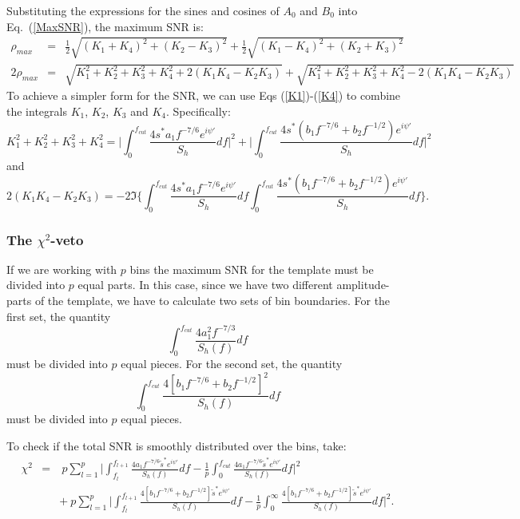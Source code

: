 Substituting the expressions for the sines and cosines of $A_0$ and
$B_0$
into Eq.~(\ref{MaxSNR}), the maximum SNR is:
\begin{eqnarray}
 \rho_{max} &=& \frac{1}{2} \sqrt{(K_1+K_4)^2 + (K_2-K_3)^2} +
\frac{1}{2} \sqrt{(K_1-K_4)^2 +(K_2+K_3)^2}\\
2\rho_{max}&=& \sqrt{ K_1^2 + K_2^2 + K_3^2 +K_4^2 + 2(K_1 K_4
	- K_2 K_3)} + \sqrt{  K_1^2 + K_2^2 + K_3^2 +K_4^2 -2(K_1
	K_4 -  K_2 K_3)} 
\end{eqnarray}
To achieve a simpler form for the SNR, we can use Eqs (\ref{K1})-(\ref{K4}) to 
combine the integrals $K_1$, $K_2$, $K_3$ and $K_4$.
Specifically:
\begin{equation}
K_1^2 + K_2^2 + K_3^2 + K_4^2 = \Big | \int_0^{f_{cut}} \frac{4 s^{\ast} a_1
	f^{-7/6} e^{i \psi'}}{S_h} df \Big |^2 + \Big | \int_0^{f_{cut}}
	\frac{4 s^{\ast} (b_1 f^{-7/6} + b_2 f^{-1/2}) e^{i \psi'}}{S_h} df
	\Big |^2
\end{equation}
and
\begin{equation}
2(K_1 K_4- K_2 K_3) = - 2 \Im \Big \{ \int_0^{f_{cut}} \frac{4 s^{\ast} a_1
	f^{-7/6} e^{i \psi'}}{S_h} df \int_0^{f_{cut}} \frac{4 s^{\ast}
	(b_1 f^{-7/6} + b_2 f^{-1/2}) e^{i \psi'}}{S_h} df \Big \}.
\end{equation}

\subsubsection*{The $\chi^2$-veto}
\label{ChisquaredVeto}

If we are working with $p$ bins the maximum SNR for the template must be 
divided into $p$ equal parts. In this case, since we have two different 
amplitude-parts of the template, we have to calculate two sets of bin
boundaries.
For the first set, the quantity
\begin{displaymath}
\int_0^{f_{cut}} \frac{4 a_1^2 f^{-7/3}}{S_h(f)} df
\end{displaymath}
must be divided into $p$ equal pieces.
For the second set, the quantity
\begin{displaymath}
\int_0^{f_{cut}} \frac{4 [b_1 f^{-7/6} + b_2 f^{-1/2}]^2}{S_h(f)} df
\end{displaymath} 
must be divided into $p$ equal pieces.

To check if the total SNR is smoothly distributed over the bins,
take:
\begin{eqnarray}
\chi^2 &=& \: p \sum_{l=1}^p  \Big | \int_{f_l}^{f_{l+1}} \frac{4 a_1 
     f^{-7/6} \tilde{s}^{\ast} e^{i \psi'}}{S_h(f)} df
     - \frac{1}{p} \int_{0}^{f_{cut}} \frac{4 a_1 f^{-7/6}
 \tilde{s}^{\ast} e^{i \psi'}}{S_h(f)} df \Big |^2 \\
      && +\: p\sum_{l=1}^p\Big | \int_{f_l}^{f_{l+1}} \frac{4[b_1 f^{-7/6}
	+ b_2 f^{-1/2} ]
     \tilde{s}^{\ast} e^{i \psi'}}{S_h(f)} df-\frac{1}{p} 
     \int_{0}^{\infty} \frac{4[b_1 f^{-7/6} + b_2 f^{-1/2}]
\tilde{s}^{\ast} e^{i \psi'}}{S_h(f)} df\Big |^2. \\
\end{eqnarray}

